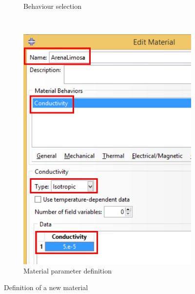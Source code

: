 \begin{figure}[!h]
\begin{subfigure}[!h]{0.36\textwidth}
    \caption{Behaviour selection}
    \label{prop02}
  \end{subfigure}%
  ~
  \begin{subfigure}[!h]{0.36\textwidth}
    \includegraphics[width=\textwidth]{./body/images/prop03.pdf}
    \caption{Material parameter definition}
    \label{prop03}
  \end{subfigure}%
  \caption{Definition of a new material}
\end{figure}


